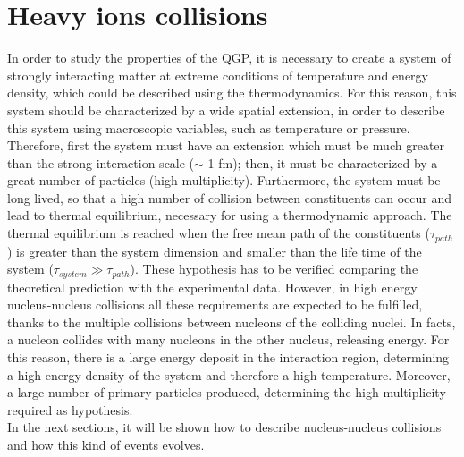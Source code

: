 \section{Heavy ions collisions}
In order to study the properties of the QGP, it is necessary to create a system of strongly interacting matter at extreme conditions of temperature and energy density, which could be described using the thermodynamics. For this reason, this system should be characterized by a wide spatial extension, in order to describe this system using macroscopic variables, such as temperature or pressure. Therefore, first the system must have an extension which must be much greater than the strong interaction scale ($\sim$ 1 fm); then, it must be characterized by a great number of particles (high multiplicity). Furthermore, the system must be long lived, so that a high number of collision between constituents can occur and lead to thermal equilibrium, necessary for using a thermodynamic approach. The thermal equilibrium is reached when the free mean path of the constituents ($\tau_{path}$) is greater than the system dimension and smaller than the life time of the system ($\tau_{system}\gg\tau_{path}$). These hypothesis has to be verified comparing the theoretical prediction with the experimental data. However, in high energy nucleus-nucleus collisions all these requirements are expected to be fulfilled, thanks to the multiple collisions between nucleons of the colliding nuclei. In facts, a nucleon collides with many nucleons in the other nucleus, releasing energy. For this reason, there is a large energy deposit in the interaction region, determining a high energy density of the system and therefore a high temperature. Moreover, a large number of primary particles produced, determining the high multiplicity required as hypothesis.\\
In the next sections, it will be shown how to describe nucleus-nucleus collisions and how this kind of events evolves.\\

